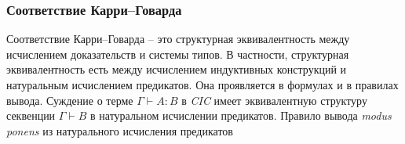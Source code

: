 \documentclass[12pt]{article}
\begin{document}










\subsubsection{Соответствие Карри--Говарда}
Соответствие Карри--Говарда -- это структурная эквивалентность между исчислением доказательств и системы типов. В частности, структурная эквивалентность есть между исчислением индуктивных конструкций и натуральным исчислением предикатов. Она проявляется в формулах и в правилах вывода. Суждение о терме $\Gamma \vdash A:B$ в \textit{CIC} имеет эквивалентную структуру секвенции $\Gamma \vdash B$ в натуральном исчислении предикатов. Правило вывода \textit{modus ponens} из натурального исчисления предикатов 
\end{document}
